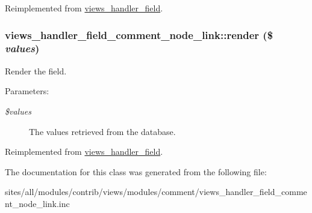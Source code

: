 Reimplemented from \hyperlink{classviews__handler__field_4f661f91bcbe80d4a00c30a31456c502}{views\_\-handler\_\-field}.\hypertarget{classviews__handler__field__comment__node__link_57a6cd4b57779b44220bc89f48c86ee6}{
\subsubsection[{render}]{\setlength{\rightskip}{0pt plus 5cm}views\_\-handler\_\-field\_\-comment\_\-node\_\-link::render (\$ {\em values})}}
\label{classviews__handler__field__comment__node__link_57a6cd4b57779b44220bc89f48c86ee6}


Render the field.

\begin{Desc}
\item[Parameters:]
\begin{description}
\item[{\em \$values}]The values retrieved from the database. \end{description}
\end{Desc}


Reimplemented from \hyperlink{classviews__handler__field_82ff951c5e9ceb97b2eab86f880cbc1e}{views\_\-handler\_\-field}.

The documentation for this class was generated from the following file:\begin{CompactItemize}
\item 
sites/all/modules/contrib/views/modules/comment/views\_\-handler\_\-field\_\-comment\_\-node\_\-link.inc\end{CompactItemize}
